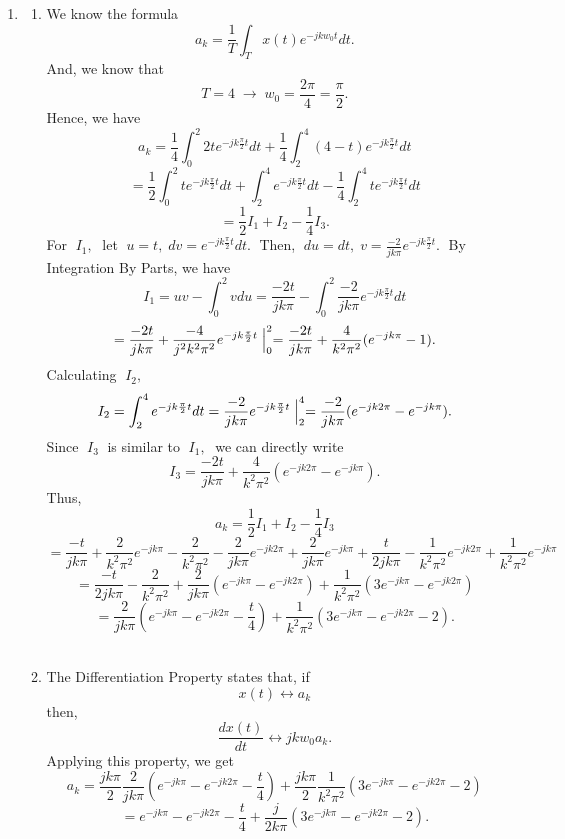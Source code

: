 \documentclass[10pt,a4paper, margin=1in]{article}
\begin{document}
\begin{enumerate}
\item %
    \begin{enumerate}
    \item %
    We know the formula
    $$a_k = \frac{1}{T}\int_{T} x(t)e^{-jkw_0t}dt.$$
    And, we know that
    $$T=4 \; \rightarrow \; w_0 = \frac{2\pi}{4} = \frac{\pi}{2}.$$
    Hence, we have
    $$a_k = \frac{1}{4}\int_{0}^{2} 2te^{-jk\frac{\pi}{2}t}dt + \frac{1}{4}\int_{2}^{4}(4-t)e^{-jk\frac{\pi}{2}t}dt$$
    $$= \frac{1}{2}\int_{0}^{2}te^{-jk\frac{\pi}{2}t}dt + \int_{2}^{4}e^{-jk\frac{\pi}{2}t}dt - \frac{1}{4}\int_{2}^{4}te^{-jk\frac{\pi}{2}t}dt$$
    $$= \frac{1}{2}I_1 + I_2 - \frac{1}{4}I_3.$$
    For $\; I_1, \;$ let $\; u=t, \; dv=e^{-jk\frac{\pi}{2}t}dt. \;$ Then, $\; du=dt, \; v=\frac{-2}{jk\pi}e^{-jk\frac{\pi}{2}t}. \;$
    By Integration By Parts, we have
    $$I_1 = uv - \int_{0}^{2}vdu = \frac{-2t}{jk\pi} - \int_{0}^{2}\frac{-2}{jk\pi}e^{-jk\frac{\pi}{2}t}dt$$
    $$= \frac{-2t}{jk\pi} + \frac{-4}{j^2k^2\pi^2}e^{-jk\frac{\pi}{2}t} \Bigm|_{0}^{2} = \frac{-2t}{jk\pi}+\frac{4}{k^2\pi^2}(e^{-jk\pi}-1).$$
    Calculating $\; I_2, \;$
    $$I_2 = \int_{2}^{4}e^{-jk\frac{\pi}{2}t}dt = \frac{-2}{jk\pi}e^{-jk\frac{\pi}{2}t} \Bigm|_{2}^{4} = \frac{-2}{jk\pi}(e^{-jk2\pi}-e^{-jk\pi}).$$
    Since $\; I_3 \;$ is similar to $\; I_1, \;$ we can directly write
    $$I_3 = \frac{-2t}{jk\pi} + \frac{4}{k^2\pi^2}(e^{-jk2\pi} - e^{-jk\pi}).$$
    Thus,
    $$a_k = \frac{1}{2}I_1 + I_2 - \frac{1}{4}I_3$$
    $$= \frac{-t}{jk\pi} + \frac{2}{k^2\pi^2}e^{-jk\pi} - \frac{2}{k^2\pi^2} - \frac{2}{jk\pi}e^{-jk2\pi} + \frac{2}{jk\pi}e^{-jk\pi} + \frac{t}{2jk\pi} - \frac{1}{k^2\pi^2}e^{-jk2\pi} + \frac{1}{k^2\pi^2}e^{-jk\pi}$$
    $$= \frac{-t}{2jk\pi} - \frac{2}{k^2\pi^2} + \frac{2}{jk\pi}(e^{-jk\pi} - e^{-jk2\pi}) + \frac{1}{k^2\pi^2}(3e^{-jk\pi} - e^{-jk2\pi})$$
    $$= \frac{2}{jk\pi}(e^{-jk\pi} - e^{-jk2\pi} - \frac{t}{4}) + \frac{1}{k^2\pi^2}(3e^{-jk\pi} - e^{-jk2\pi} - 2).$$\vspace{0.3cm}\\
    
    \item %
    The Differentiation Property states that, if
    $$x(t) \leftrightarrow a_k$$
    then,
    $$\frac{dx(t)}{dt} \leftrightarrow jkw_0a_k.$$
    Applying this property, we get
    $$a_k = \frac{jk\pi}{2}\frac{2}{jk\pi}(e^{-jk\pi}-e^{-jk2\pi}-\frac{t}{4}) + \frac{jk\pi}{2}\frac{1}{k^2\pi^2}(3e^{-jk\pi}-e^{-jk2\pi}-2)$$
    $$= e^{-jk\pi}-e^{-jk2\pi}-\frac{t}{4}+\frac{j}{2k\pi}(3e^{-jk\pi}-e^{-jk2\pi}-2).$$\vspace{0.3cm}\\
    \end{enumerate}


\end{enumerate}
\end{document}
